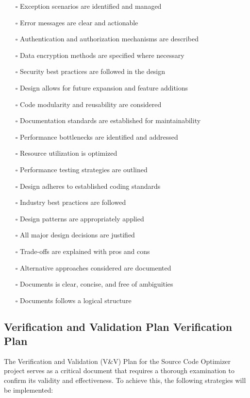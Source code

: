 \documentclass[12pt, titlepage]{article}
\begin{document}
\begin{itemize}
  \item[$\square$] Exception scenarios are identified and managed 
  \item[$\square$] Error messages are clear and actionable 
  \item[$\square$] Authentication and authorization mechanisms are described 
  \item[$\square$] Data encryption methods are specified where necessary 
  \item[$\square$] Security best practices are followed in the design
  \item[$\square$] Design allows for future expansion and feature additions 
  \item[$\square$] Code modularity and reusability are considered 
  \item[$\square$] Documentation standards are established for maintainability 
  \item[$\square$] Performance bottlenecks are identified and addressed 
  \item[$\square$] Resource utilization is optimized 
  \item[$\square$] Performance testing strategies are outlined 
  \item[$\square$] Design adheres to established coding standards 
  \item[$\square$] Industry best practices are followed 
  \item[$\square$] Design patterns are appropriately applied
  \item[$\square$] All major design decisions are justified 
  \item[$\square$] Trade-offs are explained with pros and cons 
  \item[$\square$] Alternative approaches considered are documented 
  \item[$\square$] Documents is clear, concise, and free of ambiguities 
  \item[$\square$] Documents follows a logical structure 
\end{itemize}

\subsection{Verification and Validation Plan Verification Plan}

The Verification and Validation (V\&V) Plan for the Source Code Optimizer project serves as a critical document that requires a thorough examination to confirm its validity and effectiveness. To achieve this, the following strategies will be implemented:
\end{document}
